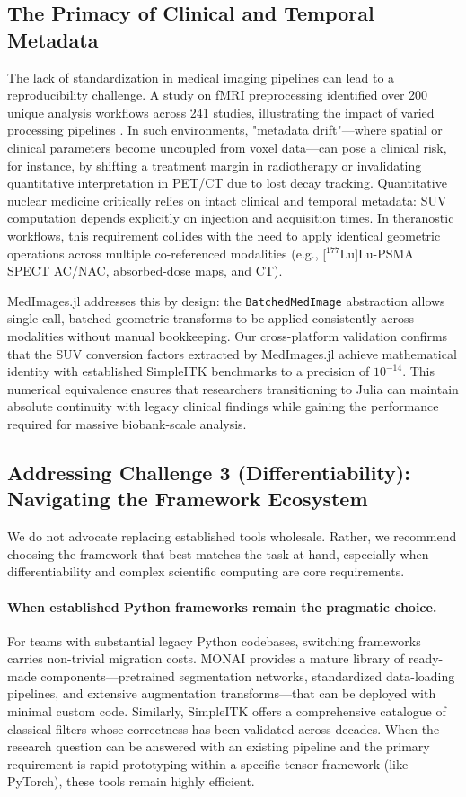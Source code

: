 \documentclass[10pt,letterpaper]{article}
\begin{document}
\subsection*{The Primacy of Clinical and Temporal Metadata}
The lack of standardization in medical imaging pipelines can lead to a reproducibility challenge. A study on fMRI preprocessing identified over 200 unique analysis workflows across 241 studies, illustrating the impact of varied processing pipelines \cite{Esteban_2018}. In such environments, "metadata drift"---where spatial or clinical parameters become uncoupled from voxel data---can pose a clinical risk, for instance, by shifting a treatment margin in radiotherapy or invalidating quantitative interpretation in PET/CT due to lost decay tracking.
Quantitative nuclear medicine critically relies on intact clinical and temporal metadata: SUV computation depends explicitly on injection and acquisition times. In theranostic workflows, this requirement collides with the need to apply identical geometric operations across multiple co-referenced modalities (e.g., [$^{177}$Lu]Lu-PSMA SPECT AC/NAC, absorbed-dose maps, and CT).

MedImages.jl addresses this by design: the \texttt{BatchedMedImage} abstraction allows single-call, batched geometric transforms to be applied consistently across modalities without manual bookkeeping. Our cross-platform validation confirms that the SUV conversion factors extracted by MedImages.jl achieve mathematical identity with established SimpleITK benchmarks to a precision of $10^{-14}$. This numerical equivalence ensures that researchers transitioning to Julia can maintain absolute continuity with legacy clinical findings while gaining the performance required for massive biobank-scale analysis.

\subsection*{Addressing Challenge 3 (Differentiability): Navigating the Framework Ecosystem}
We do not advocate replacing established tools wholesale. Rather, we recommend choosing the framework that best matches the task at hand, especially when differentiability and complex scientific computing are core requirements.

\paragraph{When established Python frameworks remain the pragmatic choice.}
For teams with substantial legacy Python codebases, switching frameworks carries non-trivial migration costs. MONAI provides a mature library of ready-made components---pretrained segmentation networks, standardized data-loading pipelines, and extensive augmentation transforms---that can be deployed with minimal custom code. Similarly, SimpleITK offers a comprehensive catalogue of classical filters whose correctness has been validated across decades. When the research question can be answered with an existing pipeline and the primary requirement is rapid prototyping within a specific tensor framework (like PyTorch), these tools remain highly efficient.
\end{document}
